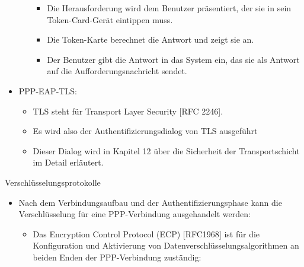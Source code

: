 \documentclass[a4paper]{article}
\begin{document}
\begin{multicols}{3}
\begin{itemize}
\begin{itemize}
                        \begin{itemize}
                            \item
                                  Die Herausforderung wird dem Benutzer präsentiert, der sie in sein
                                  Token-Card-Gerät eintippen muss.
                            \item
                                  Die Token-Karte berechnet die Antwort und zeigt sie an.
                            \item
                                  Der Benutzer gibt die Antwort in das System ein, das sie als
                                  Antwort auf die Aufforderungsnachricht sendet.
                        \end{itemize}
              \end{itemize}
        \item
              PPP-EAP-TLS:

              \begin{itemize}
                  \item
                        TLS steht für Transport Layer Security {[}RFC 2246{]}.
                  \item
                        Es wird also der Authentifizierungsdialog von TLS ausgeführt
                  \item
                        Dieser Dialog wird in Kapitel 12 über die Sicherheit der
                        Transportschicht im Detail erläutert.
              \end{itemize}
    \end{itemize}

    Verschlüsselungsprotokolle

    \begin{itemize}
        \item
              Nach dem Verbindungsaufbau und der Authentifizierungsphase kann die
              Verschlüsselung für eine PPP-Verbindung ausgehandelt werden:

              \begin{itemize}
                  \item
                        Das Encryption Control Protocol (ECP) {[}RFC1968{]} ist für die
                        Konfiguration und Aktivierung von Datenverschlüsselungsalgorithmen
                        an beiden Enden der PPP-Verbindung zuständig:


\end{itemize}
\end{itemize}
\end{multicols}
\end{document}
